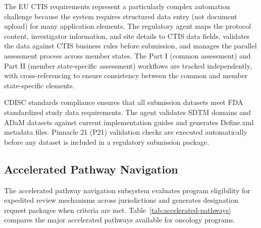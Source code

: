 The EU CTIS requirements represent a particularly complex automation challenge because the
system requires structured data entry (not document upload) for many application elements.
The regulatory agent maps the protocol content, investigator information, and site details
to CTIS data fields, validates the data against CTIS business rules before submission, and
manages the parallel assessment process across member states. The Part I (common assessment)
and Part II (member state-specific assessment) workflows are tracked independently, with
cross-referencing to ensure consistency between the common and member state-specific
elements.

CDISC standards compliance \cite{cdisc-sdtm, cdisc-adam} ensures that all submission
datasets meet FDA standardized study data requirements. The agent validates SDTM domains
and ADaM datasets against current implementation guides and generates Define.xml metadata
files. Pinnacle 21 (P21) validation checks are executed automatically before any dataset
is included in a regulatory submission package.

\subsection{Accelerated Pathway Navigation}

The accelerated pathway navigation subsystem evaluates program eligibility for expedited
review mechanisms across jurisdictions and generates designation request packages when
criteria are met. Table~\ref{tab:accelerated-pathways} compares the major accelerated
pathways available for oncology programs.

